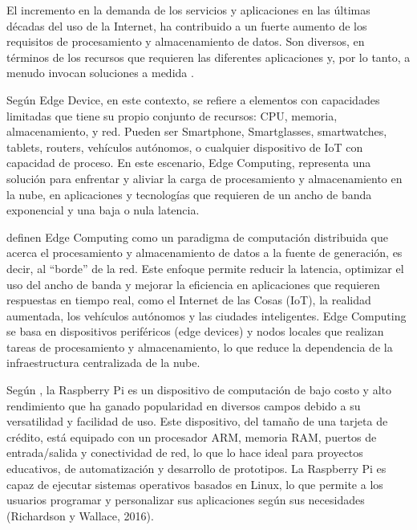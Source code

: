 

El incremento en la demanda de los servicios y aplicaciones en las últimas décadas del uso de la Internet, ha contribuido a un fuerte aumento de los requisitos de procesamiento y almacenamiento de datos.  Son diversos, en términos de los recursos que requieren las diferentes aplicaciones y, por lo tanto, a menudo invocan soluciones a medida \cite{dolui_comparison_2017}.

Según \citeauthor{medina_edge_2019} \citeyear{medina_edge_2019} Edge Device, en este contexto, se refiere a elementos con capacidades limitadas que tiene su propio conjunto de recursos: CPU, memoria, almacenamiento, y red. Pueden ser Smartphone, Smartglasses, smartwatches, tablets, routers, vehículos autónomos, o cualquier dispositivo de IoT con capacidad de proceso. En este escenario, Edge Computing, representa una solución para enfrentar y aliviar la carga de procesamiento y almacenamiento en la nube, en aplicaciones y tecnologías que requieren de un ancho de banda exponencial y una baja o nula latencia.

\citeauthor{shi_edge_2016} \citeyear{shi_edge_2016} definen Edge Computing como un paradigma de computación distribuida que acerca el procesamiento y almacenamiento de datos a la fuente de generación, es decir, al ``borde'' de la red. Este enfoque permite reducir la latencia, optimizar el uso del ancho de banda y mejorar la eficiencia en aplicaciones que requieren respuestas en tiempo real, como el Internet de las Cosas (IoT), la realidad aumentada, los vehículos autónomos y las ciudades inteligentes. Edge Computing se basa en dispositivos periféricos (edge devices) y nodos locales que realizan tareas de procesamiento y almacenamiento, lo que reduce la dependencia de la infraestructura centralizada de la nube.



Según \citeauthor{richardson_getting_2016} \citeyear{richardson_getting_2016}, la Raspberry Pi es un dispositivo de computación de bajo costo y alto rendimiento que ha ganado popularidad en diversos campos debido a su versatilidad y facilidad de uso. Este dispositivo, del tamaño de una tarjeta de crédito, está equipado con un procesador ARM, memoria RAM, puertos de entrada/salida y conectividad de red, lo que lo hace ideal para proyectos educativos, de automatización y desarrollo de prototipos. La Raspberry Pi es capaz de ejecutar sistemas operativos basados en Linux, lo que permite a los usuarios programar y personalizar sus aplicaciones según sus necesidades (Richardson y Wallace, 2016).

